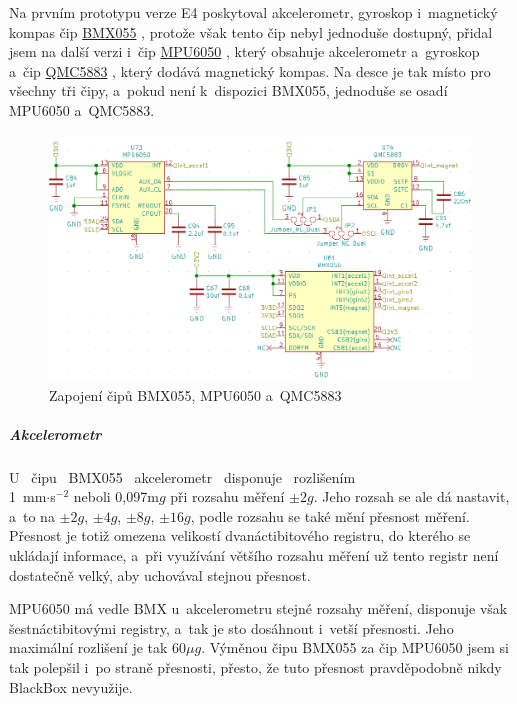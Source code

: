 Na prvním prototypu verze E4 poskytoval akcelerometr, gyroskop i~magnetický kompas čip \href{https://datasheet.lcsc.com/szlcsc/Bosch-Sensortec-BMX055_C94022.pdf}{BMX055} \parencite{bmx055},
protože však tento čip nebyl jednoduše dostupný, přidal jsem na další verzi i~čip \href{https://datasheet.lcsc.com/szlcsc/TDK-InvenSense-MPU-6050_C24112.pdf}{MPU6050} \parencite{mpu6050},
který obsahuje akcelerometr a~gyroskop a~čip \href{https://datasheet.lcsc.com/szlcsc/QST-QMC5883L-TR_C192585.pdf}{QMC5883} \parencite{qmc5883}, který dodává magnetický kompas.
Na desce je tak místo pro všechny tři čipy, a~pokud není k~dispozici BMX055, jednoduše se osadí MPU6050 a~QMC5883. 

\begin{figure}[h]
    \centering
    \includegraphics[width=\textwidth]{kapitoly/obrazky/E4/vnimani/BMX-MPU-QMC.png}
    \caption{Zapojení čipů BMX055, MPU6050 a~QMC5883}
    \label{fig:E4-9axis}
\end{figure}

\vspace{-5mm}

\subparagraph*{Akcelerometr}
\label{akcelerometr}
U \ čipu \ BMX055 \ akcelerometr \ disponuje \ rozlišením \\ 1~mm$\cdot$s$^{-2}$ neboli 0,097m$g$ při rozsahu měření $\pm2g$. 
Jeho rozsah se ale dá nastavit, a~to na $\pm2g$, $\pm4g$, $\pm8g$, $\pm16g$, 
podle rozsahu se také mění přesnost měření. Přesnost je totiž omezena velikostí dvanáctibitového registru, do 
kterého se ukládají informace, a~při využívání většího 
rozsahu měření už tento registr není dostatečně velký, aby uchovával stejnou přesnost.

MPU6050 má vedle BMX u~akcelerometru stejné rozsahy měření, disponuje však šestnáctibitovými registry, a~tak je 
sto dosáhnout i~vetší přesnosti. Jeho maximální rozlišení je 
tak 60$\mu g$. Výměnou čipu BMX055 za čip MPU6050 jsem si tak polepšil i~po straně přesnosti, přesto, že tuto přesnost 
pravděpo\-dob\-ně nikdy BlackBox nevyužije. %

